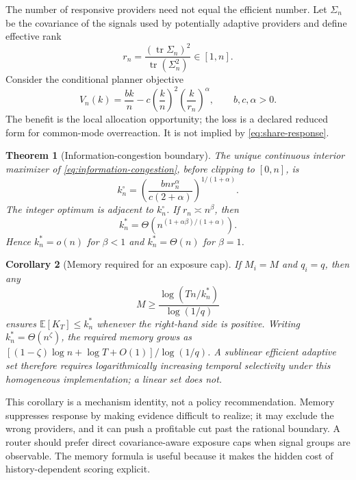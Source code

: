 \documentclass[10pt,twocolumn]{article}
\newtheorem{theorem}{Theorem}
\newtheorem{corollary}[theorem]{Corollary}
\newcommand{\E}{\mathbb{E}}
\begin{document}
The number of responsive providers need not equal the efficient number.  Let
$\Sigma_n$ be the covariance of the signals used by potentially adaptive
providers and define effective rank
\begin{equation}
 r_n=\frac{(\operatorname{tr}\Sigma_n)^2}
 {\operatorname{tr}(\Sigma_n^2)}\in[1,n].
 \label{eq:effective-rank}
\end{equation}
Consider the conditional planner objective
\begin{equation}
 V_n(k)=\frac{bk}{n}
 -c\left(\frac{k}{n}\right)^2
       \left(\frac{k}{r_n}\right)^\alpha,
 \qquad b,c,\alpha>0.
 \label{eq:information-congestion}
\end{equation}
The benefit is the local allocation opportunity; the loss is a declared
reduced form for common-mode overreaction.  It is not implied by
\cref{eq:share-response}.

\begin{theorem}[Information-congestion boundary]
The unique continuous interior maximizer of \cref{eq:information-congestion},
before clipping to $[0,n]$, is
\begin{equation}
 k_n^\circ=\left(
 \frac{b n r_n^\alpha}{c(2+\alpha)}
 \right)^{1/(1+\alpha)}.
 \label{eq:information-kstar}
\end{equation}
The integer optimum is adjacent to $k_n^\circ$.  If
$r_n\asymp n^\beta$, then
\begin{equation}
 k_n^*=\Theta\!\left(
 n^{(1+\alpha\beta)/(1+\alpha)}
 \right).
 \label{eq:information-scaling}
\end{equation}
Hence $k_n^*=o(n)$ for $\beta<1$ and $k_n^*=\Theta(n)$ for $\beta=1$.
\label{thm:information}
\end{theorem}

\begin{corollary}[Memory required for an exposure cap]
If $M_i=M$ and $q_i=q$, then any
\begin{equation}
 M\ge
 \frac{\log(Tn/k_n^*)}{\log(1/q)}
 \label{eq:memory-cap}
\end{equation}
ensures $\E[K_T]\le k_n^*$ whenever the right-hand side is positive.  Writing
$k_n^*=\Theta(n^\zeta)$, the required memory grows as
$[(1-\zeta)\log n+\log T+O(1)]/\log(1/q)$.  A sublinear efficient adaptive set
therefore requires logarithmically increasing temporal selectivity under this
homogeneous implementation; a linear set does not.
\label{cor:memory-cap}
\end{corollary}

This corollary is a mechanism identity, not a policy recommendation.  Memory
suppresses response by making evidence difficult to realize; it may exclude the
wrong providers, and it can push a profitable cut past the rational boundary.
A router should prefer direct covariance-aware exposure caps when signal groups
are observable.  The memory formula is useful because it makes the hidden cost
of history-dependent scoring explicit.
\end{document}
